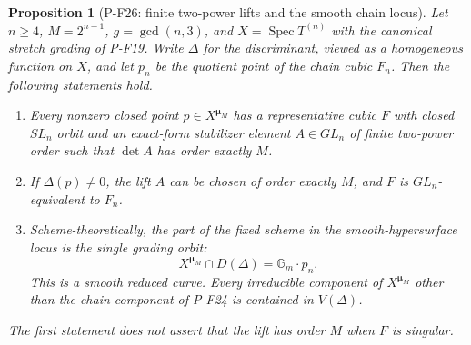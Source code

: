 \documentclass[11pt,a4paper]{article}
\newtheorem{proposition}{Proposition}[section]
\begin{document}
\begin{proposition}[P-F26: finite two-power lifts and the smooth chain locus]
\label{prop:finitecubiclift}
Let $n\ge4$, $M=2^{n-1}$, $g=\gcd(n,3)$, and
$X=\operatorname{Spec}T^{(n)}$ with the canonical stretch grading
of P-F19. Write $\Delta$ for the discriminant, viewed as a
homogeneous function on $X$, and let $p_n$ be the quotient point
of the chain cubic $F_n$. Then the following statements hold.

\begin{enumerate}
\item Every nonzero closed point $p\in X^{\boldsymbol\mu_M}$
has a representative cubic $F$ with closed $SL_n$ orbit and an
exact-form stabilizer element $A\in GL_n$ of finite two-power
order such that $\det A$ has order exactly $M$.
\item If $\Delta(p)\ne0$, the lift $A$ can be chosen of order
exactly $M$, and $F$ is $GL_n$-equivalent to $F_n$.
\item Scheme-theoretically, the part of the fixed scheme in
the smooth-hypersurface locus is the single grading orbit:
\[
 X^{\boldsymbol\mu_M}\cap D(\Delta)
      =\mathbb G_m\cdot p_n.
 \tag{P-F26a}
\]
This is a smooth reduced curve. Every irreducible component of
$X^{\boldsymbol\mu_M}$ other than the chain component of P-F24
is contained in $V(\Delta)$.
\end{enumerate}
The first statement does not assert that the lift has order $M$
when $F$ is singular.
\end{proposition}
\end{document}

